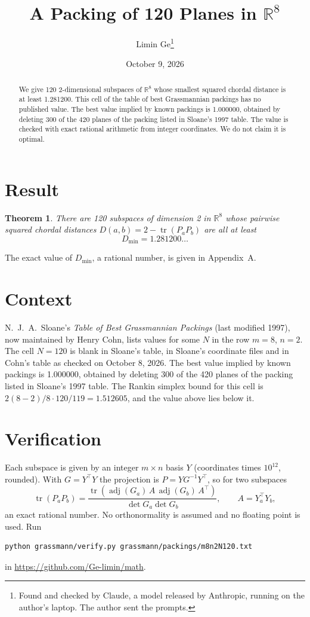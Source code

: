\documentclass[11pt,a4paper]{article}
\title{A Packing of 120 Planes in $\mathbb{R}^{8}$}
\author{Limin Ge\thanks{Found and checked by Claude, a model released by Anthropic, running on the author's laptop. The author sent the prompts.}}
\date{October 9, 2026}
\newtheorem*{theorem}{Theorem}
\begin{document}
\maketitle
\begin{abstract}
We give 120 2-dimensional subspaces of $\mathbb{R}^{8}$ whose smallest squared chordal distance is at least 1.281200. This cell of the table of best Grassmannian packings has no published value. The best value implied by known packings is 1.000000, obtained by deleting 300 of the 420 planes of the packing listed in Sloane's 1997 table. The value is checked with exact rational arithmetic from integer coordinates. We do not claim it is optimal.
\end{abstract}

\section{Result}
\begin{theorem}
There are 120 subspaces of dimension 2 in $\mathbb{R}^{8}$ whose pairwise squared chordal distances $D(a,b) = 2 - \operatorname{tr}(P_aP_b)$ are all at least
\[ D_{\min} = 1.281200\ldots \]
\end{theorem}
The exact value of $D_{\min}$, a rational number, is given in Appendix~A.


\section{Context}
N.~J.~A.~Sloane's \emph{Table of Best Grassmannian Packings} (last modified 1997), now maintained by Henry Cohn, lists values for some $N$ in the row $m=8$, $n=2$. The cell $N=120$ is blank in Sloane's table, in Sloane's coordinate files and in Cohn's table as checked on October 8, 2026. The best value implied by known packings is 1.000000, obtained by deleting 300 of the 420 planes of the packing listed in Sloane's 1997 table. The Rankin simplex bound for this cell is $2(8-2)/8\cdot 120/119 = 1.512605$, and the value above lies below it.


\section{Verification}
Each subspace is given by an integer $m\times n$ basis $Y$ (coordinates times $10^{12}$, rounded). With $G=Y^\top Y$ the projection is $P=YG^{-1}Y^\top$, so for two subspaces
\[ \operatorname{tr}(P_aP_b)=\frac{\operatorname{tr}(\operatorname{adj}(G_a)\,A\,\operatorname{adj}(G_b)\,A^\top)}{\det G_a\det G_b},\qquad A=Y_a^\top Y_b, \]
an exact rational number. No orthonormality is assumed and no floating point is used. Run
\begin{verbatim}
python grassmann/verify.py grassmann/packings/m8n2N120.txt
\end{verbatim}
in \url{https://github.com/Ge-limin/math}.
\end{document}
